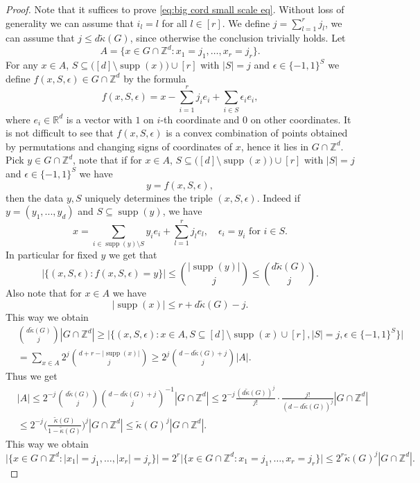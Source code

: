 \documentclass[a4paper,oneside, reqno]{amsart}
\numberwithin{equation}{section}
\theoremstyle{definition}%
\theoremstyle{definition}
\theoremstyle{definition}%
\theoremstyle{definition}
\newcommand{\Z}{\mathbb{Z}}
\newcommand{\R}{\mathbb{R}}
\DeclareMathOperator{\supp}{supp}
\begin{document}
\begin{proof}
    Note that it suffices to prove \eqref{eq:big cord small scale eq}. Without loss of generality we can assume that $i_l=l$ for all $l \in [r]$. We define $j=\sum_{l=1}^rj_l$, we can assume that $j \le d \widetilde{\kappa}(G)$, since otherwise the conclusion trivially holds. Let 
    \[
    A= \Big\{ x \in G \cap \Z^d: x_{1}=j_1, \ldots,x_{r}=j_r \Big\}.
    \]
    For any $x \in A$, $S \subseteq \big([d] \setminus \supp(x)\big) \cup [r]$ with $|S|=j$ and $\epsilon \in \{-1,1\}^S$ we define $f(x,S,\epsilon) \in G \cap \Z^d$ by the formula
    \[
    f(x,S,\epsilon)=x-\sum_{i=1}^r j_i e_i+\sum_{i \in S}\epsilon_i e_i,
    \]
    where $e_i \in \R^d$ is a vector with $1$ on $i$-th coordinate and $0$ on other coordinates.
    It is not difficult to see that $f(x,S,\epsilon)$ is a convex combination of points obtained by permutations and changing signs of coordinates of $x$, hence it lies in $G \cap \Z^d$.
    Pick $y \in G \cap \Z^d$, note that if for
     $x \in A$, $S \subseteq \big([d] \setminus \supp(x)\big) \cup [r]$ with $|S|=j$ and $\epsilon \in \{-1,1\}^S$ we have
     \[
     y=f(x,S,\epsilon),
     \]
     then the data $y,S$ uniquely determines the triple $(x,S,\epsilon)$. Indeed if $y=(y_1,...,y_d)$ and $S \subseteq \supp(y)$, we have
     \[
     x= \sum_{i \in \supp(y) \setminus S} y_ie_i + \sum_{l=1}^r j_l e_l, \quad \epsilon_i=y_i \text{ for } i \in S.
     \]
     In particular for fixed $y$ we get that 
     \[
     \Big|\Big\{(x,S,\epsilon): f(x,S,\epsilon)=y \Big\}\Big| \le \binom{|\supp(y)|}{j}\le \binom{d\widetilde{\kappa}(G)}{j}.
     \]
     Also note that for $x \in A$ we have
     \[
     |\supp(x)| \le r+d\widetilde{\kappa}(G)-j.
     \]
    This way we obtain
    \begin{align*}
        &\binom{d\widetilde{\kappa}(G)}{j} |G \cap \Z^d| \ge \Big|\Big\{(x,S,\epsilon): x \in A,S \subseteq [d] \setminus \supp(x) \cup [r],|S|=j,\epsilon \in \{-1,1\}^S\Big\}\Big|\\
        &= \sum_{x \in A} 2^j \binom{d+r-|\supp(x)|}{j} \ge 2^j \binom{d-d \widetilde{\kappa}(G)+j}{j} |A|.
    \end{align*}
    Thus we get
    \begin{align*}
       &|A| \le 2^{-j}  \binom{d\widetilde{\kappa}(G)}{j} \binom{d-d \widetilde{\kappa}(G)+j}{j}^{-1}|G \cap \Z^d| \le 2^{-j} \frac{(d \widetilde{\kappa}(G))^{j}}{j!} \cdot \frac{j!}{(d-d \widetilde{\kappa}(G))^{j}}|G \cap \Z^d| \\
       &\le 2^{-j} \Big(\frac{\widetilde{\kappa}(G)}{1-\widetilde{\kappa}(G)}\Big)^j |G \cap \Z^d| \le \widetilde{\kappa}(G)^j|G \cap \Z^d|.
    \end{align*}
    This way we obtain
    \[
     \Big| \Big\{ x \in G \cap \Z^d: |x_{1}|=j_1, \ldots,|x_{r}|=j_r \Big\}\Big| =2^r \Big| \Big\{ x \in G \cap \Z^d: x_{1}=j_1, \ldots,x_{r}=j_r \Big\}\Big| \le 2^r \widetilde{\kappa}(G)^j |G \cap \Z^d|.
    \]
\end{proof}
\end{document}
